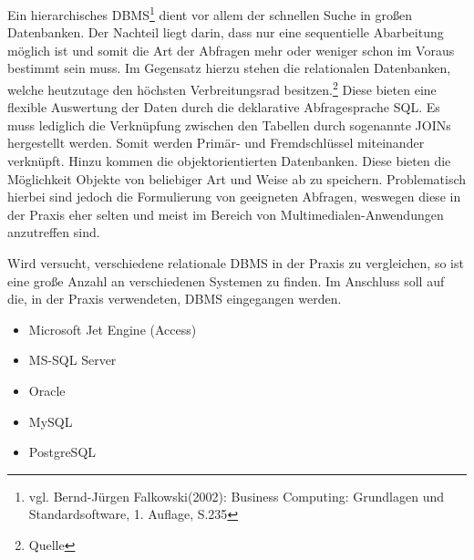 Ein hierarchisches DBMS\footnote{vgl. Bernd-Jürgen Falkowski(2002): Business Computing: Grundlagen und Standardsoftware, 1. Auflage, S.235} dient vor allem der schnellen Suche in großen Datenbanken.
Der Nachteil liegt darin, dass nur eine sequentielle Abarbeitung möglich ist und somit die Art der Abfragen mehr oder weniger schon im Voraus bestimmt sein muss.
Im Gegensatz hierzu stehen die relationalen Datenbanken, welche heutzutage den höchsten Verbreitungsrad besitzen.\footnote{Quelle}
Diese bieten eine flexible Auswertung der Daten durch die deklarative Abfragesprache SQL.
Es muss lediglich die Verknüpfung zwischen den Tabellen durch sogenannte JOINs hergestellt werden. Somit werden Primär- und Fremdschlüssel miteinander verknüpft.
Hinzu kommen die objektorientierten Datenbanken. Diese bieten die Möglichkeit Objekte von beliebiger Art und Weise ab zu speichern.
Problematisch hierbei sind jedoch die Formulierung von geeigneten Abfragen, weswegen diese in der Praxis eher selten und meist im Bereich von Multimedialen-Anwendungen anzutreffen sind.%

Wird versucht, verschiedene relationale DBMS in der Praxis zu vergleichen, so ist eine große Anzahl an verschiedenen Systemen zu finden.
Im Anschluss soll auf die, in der Praxis verwendeten, DBMS eingegangen werden.

\begin{itemize}
\item Microsoft Jet Engine (Access)
\item MS-SQL Server
\item Oracle
\item MySQL
\item PostgreSQL
\end{itemize}

